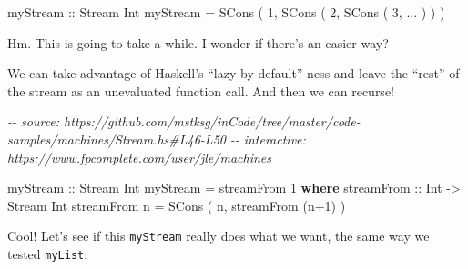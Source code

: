 \documentclass[]{article}
\newenvironment{Shaded}{}{}
\newcommand{\CommentTok}[1]{\textcolor[rgb]{0.38,0.63,0.69}{\textit{#1}}}
\newcommand{\DataTypeTok}[1]{\textcolor[rgb]{0.56,0.13,0.00}{#1}}
\newcommand{\DecValTok}[1]{\textcolor[rgb]{0.25,0.63,0.44}{#1}}
\newcommand{\KeywordTok}[1]{\textcolor[rgb]{0.00,0.44,0.13}{\textbf{#1}}}
\newcommand{\NormalTok}[1]{#1}
\newcommand{\OperatorTok}[1]{\textcolor[rgb]{0.40,0.40,0.40}{#1}}
\newcommand{\OtherTok}[1]{\textcolor[rgb]{0.00,0.44,0.13}{#1}}
\begin{document}
\begin{Shaded}
\begin{Highlighting}[]
\OtherTok{myStream\textquotesingle{} ::} \DataTypeTok{Stream} \DataTypeTok{Int}
\NormalTok{myStream\textquotesingle{} }\OtherTok{=} \DataTypeTok{SCons}\NormalTok{ ( }\DecValTok{1}\NormalTok{, }\DataTypeTok{SCons}\NormalTok{ ( }\DecValTok{2}\NormalTok{, }\DataTypeTok{SCons}\NormalTok{ ( }\DecValTok{3}\NormalTok{, }\OperatorTok{...}\NormalTok{ ) ) )}
\end{Highlighting}
\end{Shaded}

Hm. This is going to take a while. I wonder if there's an easier way?

We can take advantage of Haskell's ``lazy-by-default''-ness and leave the
``rest'' of the stream as an unevaluated function call. And then we can recurse!

\begin{Shaded}
\begin{Highlighting}[]
\CommentTok{{-}{-} source: https://github.com/mstksg/inCode/tree/master/code{-}samples/machines/Stream.hs\#L46{-}L50}
\CommentTok{{-}{-} interactive: https://www.fpcomplete.com/user/jle/machines}

\OtherTok{myStream ::} \DataTypeTok{Stream} \DataTypeTok{Int}
\NormalTok{myStream }\OtherTok{=}\NormalTok{ streamFrom }\DecValTok{1}
  \KeywordTok{where}
\OtherTok{    streamFrom ::} \DataTypeTok{Int} \OtherTok{{-}\textgreater{}} \DataTypeTok{Stream} \DataTypeTok{Int}
\NormalTok{    streamFrom n }\OtherTok{=} \DataTypeTok{SCons}\NormalTok{ ( n, streamFrom (n}\OperatorTok{+}\DecValTok{1}\NormalTok{) )}
\end{Highlighting}
\end{Shaded}

Cool! Let's see if this \texttt{myStream} really does what we want, the same way
we tested \texttt{myList}:
\end{document}
